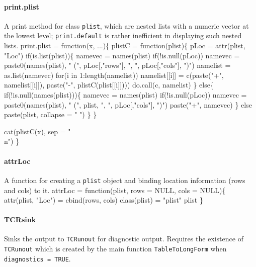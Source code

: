 \documentclass[a4paper]{article}
\begin{document}
\paragraph{print.plist}
A print method for class \verb|plist|, which are nested lists with a
numeric vector at the lowest level; \verb|print.default| is rather
inefficient in displaying such nested lists.
\nwenddocs{}\endmoddef
print.plist =
  function(x, ...)\{
    plistC = function(plist)\{
      pLoc = attr(plist, "Loc")
      if(is.list(plist))\{
        namevec = names(plist)
        if(!is.null(pLoc))
          namevec = paste0(names(plist),
            " (", pLoc[,"rows"], ", ", pLoc[,"cols"], ")")
        namelist = as.list(namevec)
        for(i in 1:length(namelist))
          namelist[[i]] =
            c(paste("+", namelist[[i]]),
              paste("-", plistC(plist[[i]])))
        do.call(c, namelist)
      \} else\{
        if(!is.null(names(plist)))\{
          namevec = names(plist)
          if(!is.null(pLoc))
            namevec = paste0(names(plist),
              " (", plist, ", ", pLoc[,"cols"], ")")
          paste("+", namevec)
        \} else paste(plist, collapse = " ")
      \}
    \}
  
    cat(plistC(x), sep = "\\n")
  \}
\nwendcode{}\nwdocspar

\paragraph{attrLoc}
A function for creating a \verb|plist| object and binding location
information (rows and cols) to it.
\nwenddocs{}\endmoddef
attrLoc =
  function(plist, rows = NULL, cols = NULL)\{
    attr(plist, "Loc") = cbind(rows, cols)
    class(plist) = "plist"
    plist
  \}
\eatline
{}\nwendcode{}\nwdocspar

\paragraph{TCRsink}
Sinks the output to \verb|TCRunout| for diagnostic output. Requires
the existence of \verb|TCRunout| which is created by the main function
\verb|TableToLongForm| when \verb|diagnostics = TRUE|.
\end{document}
